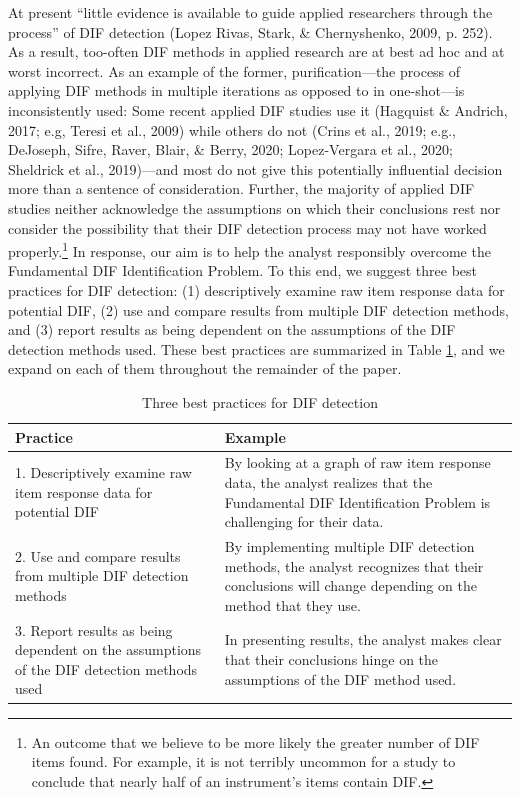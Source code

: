 \documentclass[
  english,
  man,floatsintext]{apa6}
\begin{document}
At present ``little evidence is available to guide applied researchers through the process'' of DIF detection (Lopez Rivas, Stark, \& Chernyshenko, 2009, p. 252). As a result, too-often DIF methods in applied research are at best ad hoc and at worst incorrect. As an example of the former, purification---the process of applying DIF methods in multiple iterations as opposed to in one-shot---is inconsistently used: Some recent applied DIF studies use it (Hagquist \& Andrich, 2017; e.g, Teresi et al., 2009) while others do not (Crins et al., 2019; e.g., DeJoseph, Sifre, Raver, Blair, \& Berry, 2020; Lopez-Vergara et al., 2020; Sheldrick et al., 2019)---and most do not give this potentially influential decision more than a sentence of consideration. Further, the majority of applied DIF studies neither acknowledge the assumptions on which their conclusions rest nor consider the possibility that their DIF detection process may not have worked properly.\footnote{An outcome that we believe to be more likely the greater number of DIF items found. For example, it is not terribly uncommon for a study to conclude that nearly half of an instrument's items contain DIF.} In response, our aim is to help the analyst responsibly overcome the Fundamental DIF Identification Problem. To this end, we suggest three best practices for DIF detection: (1) descriptively examine raw item response data for potential DIF, (2) use and compare results from multiple DIF detection methods, and (3) report results as being dependent on the assumptions of the DIF detection methods used. These best practices are summarized in Table \ref{tab:suggest}, and we expand on each of them throughout the remainder of the paper.

\begin{table}[h]
\caption{Three best practices for DIF detection}
\centering
\begin{tabular}{|p{6cm}|p{9cm}|}
\toprule
 \textbf{Practice} & \textbf{Example} \\\midrule
 1. Descriptively examine raw item response data for potential DIF & By looking at a graph of raw item response data, the analyst realizes that the Fundamental DIF Identification Problem is challenging for their data.  \\\hline
 2. Use and compare results from multiple DIF detection methods & By implementing multiple DIF detection methods, the analyst recognizes that their conclusions will change depending on the method that they use. \\\hline
 3. Report results as being dependent on the assumptions of the DIF detection methods used & In presenting results, the analyst makes clear that their conclusions hinge on the assumptions of the DIF method used. \\ 
\bottomrule
\end{tabular}
\label{tab:suggest}
\end{table}
\end{document}
